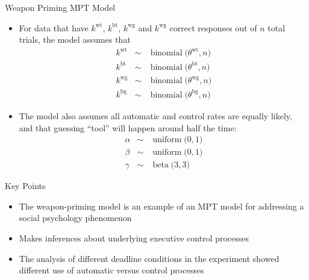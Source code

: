 \documentclass[aspectratio=169]{beamer}
\begin{document}
\begin{frame}[fragile]{Weapon Priming MPT Model}
\begin{itemize}
\item For data that have $k^{\mathrm{wt}}$, $k^{\mathrm{bt}}$, $k^{\mathrm{wg}}$ and $k^{\mathrm{wg}}$ correct responses out of $n$ total trials, the model assumes that
\begin{eqnarray}
 k^{\mathrm{wt}} &\sim& \operatorname{binomial}\bigl(\theta^{\mathrm{wt}}, n\bigr) \nonumber\\
 k^{\mathrm{bt}} &\sim& \operatorname{binomial}\bigl(\theta^{\mathrm{bt}},  n\bigr) \nonumber\\
  k^{\mathrm{wg}} &\sim& \operatorname{binomial}\bigl(\theta^{\mathrm{wg}}, n\bigr) \nonumber\\
 k^{\mathrm{bg}} &\sim& \operatorname{binomial}\bigl(\theta^{\mathrm{bg}},  n\bigr) \nonumber
\end{eqnarray}
\item The model also assumes all automatic and control rates are equally likely,  and that guessing ``tool'' will happen around half the time: 
\begin{eqnarray}
\alpha &\sim& \operatorname{uniform}\bigl(0, 1\bigr) \nonumber\\
\beta &\sim&\operatorname{uniform}\bigl(0, 1\bigr) \nonumber\\
\gamma &\sim&\operatorname{beta}\bigl(3, 3\bigr) \nonumber
\end{eqnarray}
\end{itemize}
\vspace{1em}
\end{frame}


\begin{frame}[fragile]{Key Points}
\begin{itemize}
\item  The weapon-priming model is an example of an MPT model for addressing a social psychology phenomenon
\item Makes inferences about underlying executive control processes
\item The analysis of different deadline conditions in the experiment showed different use of automatic versus control processes
\end{itemize}
\vspace{8em}
\end{frame}
\end{document}
